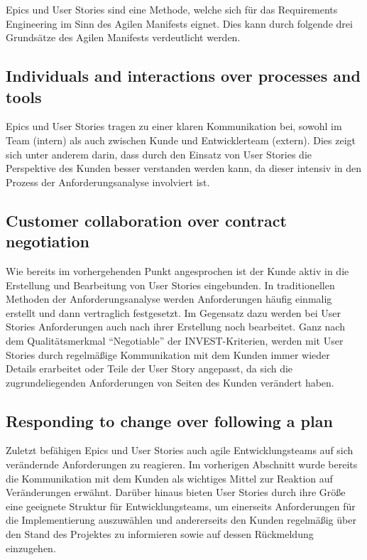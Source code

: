 \documentclass[acmtog]{acmart}
\begin{document}

Epics und User Stories sind eine Methode, welche sich für das Requirements Engineering im Sinn des Agilen Manifests \cite{agile_manifesto_2001} eignet.
Dies kann durch folgende drei Grundsätze des Agilen Manifests verdeutlicht werden.

\subsection{Individuals and interactions over processes and tools}
Epics und User Stories tragen zu einer klaren Kommunikation bei, sowohl im Team (intern) als auch zwischen Kunde und Entwicklerteam (extern).
Dies zeigt sich unter anderem darin, dass durch den Einsatz von User Stories die Perspektive des Kunden besser verstanden werden kann,
da dieser intensiv in den Prozess der Anforderungsanalyse involviert ist.

\subsection{Customer collaboration over contract negotiation}
Wie bereits im vorhergehenden Punkt angesprochen ist der Kunde aktiv in die Erstellung und Bearbeitung von User Stories eingebunden.
In traditionellen Methoden der Anforderungsanalyse werden Anforderungen häufig einmalig erstellt und dann vertraglich festgesetzt.
Im Gegensatz dazu werden bei User Stories Anforderungen auch nach ihrer Erstellung noch bearbeitet.
Ganz nach dem Qualitätsmerkmal ``Negotiable'' der INVEST-Kriterien, werden mit User Stories
durch regelmäßige Kommunikation mit dem Kunden immer wieder Details erarbeitet oder Teile der User Story angepasst, da sich die zugrundeliegenden
Anforderungen von Seiten des Kunden verändert haben.

\subsection{Responding to change over following a plan}
Zuletzt befähigen Epics und User Stories auch agile Entwicklungsteams auf sich verändernde Anforderungen zu reagieren.
Im vorherigen Abschnitt wurde bereits die Kommunikation mit dem Kunden als wichtiges Mittel zur Reaktion auf Veränderungen erwähnt.
Darüber hinaus bieten User Stories durch ihre Größe eine geeignete Struktur für Entwicklungsteams, um einerseits
Anforderungen für die Implementierung auszuwählen und andererseits den Kunden regelmäßig über den
Stand des Projektes zu informieren sowie auf dessen Rückmeldung einzugehen.
\end{document}

